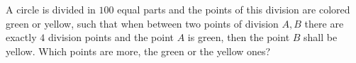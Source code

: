 A circle is divided in $100$ equal parts and the points of this division are colored green or yellow, such that when between two points of division $A,B$ there are exactly $4$ division points and the point $A$ is green, then the point $B$ shall be yellow. Which points are more, the green or the yellow ones?